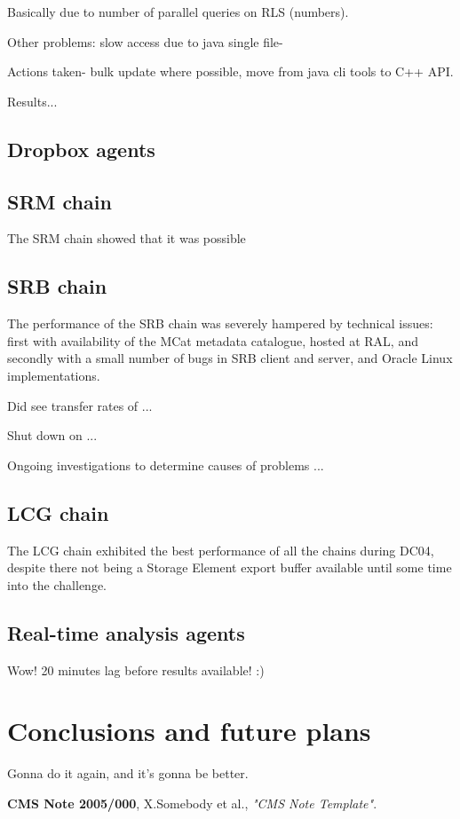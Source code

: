 \documentclass{cmspaper}
\begin{document}
Basically due to number of parallel queries on RLS (numbers).

Other problems: slow access due to java single file-

Actions taken- bulk update where possible, move from java cli tools to C++ API.

Results...

\subsection{Dropbox agents}

\subsection{SRM chain}
The SRM chain showed that it was possible

\subsection{SRB chain}
The performance of the SRB chain was severely hampered by technical issues:
first with availability of the MCat metadata catalogue, hosted at RAL, and
secondly with a small number of bugs in SRB client and server, and Oracle
Linux implementations.

Did see transfer rates of ...

Shut down on ...

Ongoing investigations to determine causes of problems ...

\subsection{LCG chain}
The LCG chain exhibited the best performance of all the chains during DC04,
despite there not being a Storage Element export buffer available until
some time into the challenge.

\subsection{Real-time analysis agents}
Wow! 20 minutes lag before results available! :)

\section{Conclusions and future plans}
Gonna do it again, and it's gonna be better.

\begin{thebibliography}{9}
   {\bf CMS Note 2005/000},
    X.Somebody et al.,
    {\em "CMS Note Template"}.
\end{thebibliography}
 
\end{document}
